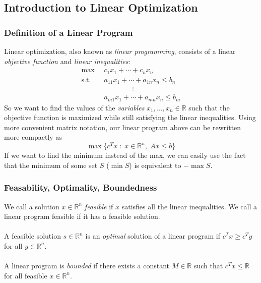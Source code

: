 \documentclass[a4paper,12pt]{scrartcl}
\theoremstyle{definition}
\theoremstyle{remark}
\begin{document}
\subsection{Introduction to Linear Optimization}

\subsubsection{Definition of a Linear Program}

Linear optimization, also known as \emph{linear programming},
consists of a linear \emph{objective function} and \emph{linear
inequalities}:
\begin{align*}
   \max \; \;& c_1 x_1 + \cdots + c_n x_n \\
   \text{s.t.} \; \;&a_{11} x_1 + \cdots + a_{1n} x_n \leq b_n \\
   & \qquad\qquad \vdots \\
   &a_{m1} x_1 + \cdots + a_{mn} x_n \leq b_m
\end{align*}
So we want to find the values of the \emph{variables}
$x_1, \ldots, x_n \in \mathbb{R}$ such that
the objective function is maximized while still satisfying the
linear inequalities. Using more convenient matrix notation,
our linear program above can be rewritten more compactly as
\begin{equation}
   \label{lp}
   \max \{ c^T x \; : \; x \in \mathbb{R}^n , \; Ax \leq b \}
\end{equation}
If we want to find the minimum instead of the max, we can easily
use the fact that the minimum of some set $S$ ($\min S$) is equivalent
to $-\max S$.

\subsubsection{Feasability, Optimality, Boundedness}

We call a solution $x \in \mathbb{R}^n$ \emph{feasible} if $x$
satisfies all the linear inequalities.  We call a linear program
feasible if it has a feasible solution.
\\
\\
A feasible solution $s \in \mathbb{R}^n$ is an \emph{optimal} solution
of a linear program if $c^T x \geq c^T y $ for all $y\in \mathbb{R}^n$.
\\
\\
A linear program is \emph{bounded} if there exists a constant $M\in
\mathbb{R}$ such that $c^T x \leq \mathbb{R}$ for all feasible
$x \in \mathbb{R}^n$.
\end{document}
